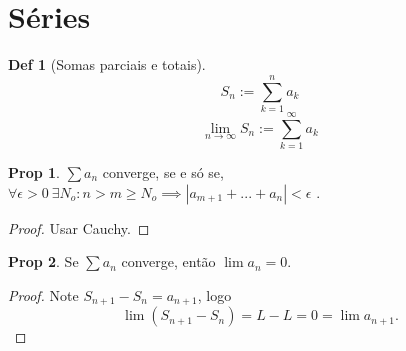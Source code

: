 \documentclass[journal, letterpaper]{IEEEtran}
\theoremstyle{definition}
\newtheorem{definition}{Def}[section]
\newtheorem{proposition}{Prop}
\begin{document}
\section{Séries} %
\label{sec:Séries}

\begin{definition}[Somas parciais e totais]
    $$S_n := \sum^n_{k=1} a_k$$
    $$\lim_{n\to \infty} S_n := \sum^\infty_{k=1} a_k$$
\end{definition}
\begin{proposition}
    $\sum a_n$ converge, se e só se, $\forall \epsilon >0
    \ \exists N_o : n > m \geq N_o \implies |a_{m+1} + ... + a_n| < \epsilon$ .
\end{proposition}
\begin{proof}
    Usar Cauchy.
\end{proof}

\begin{proposition}
    Se $\sum a_n$ converge, então $\lim a_n = 0$.
\end{proposition}
\begin{proof}
    Note $S_{n+1} - S_n = a_{n+1}$, logo
    $$
    \lim (S_{n+1} - S_n) = L - L = 0 = \lim a_{n+1}.
    $$
\end{proof}

  
  
\end{document}
